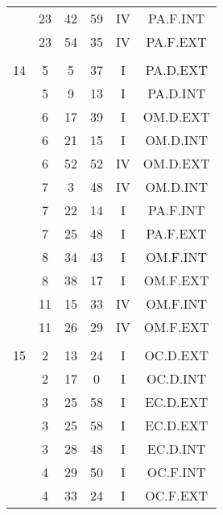 \documentclass[12pt, a4paper]{article}
\begin{document}
\begin{multicols}{3}
{\begin{tabular}{c c c c c c}
	 	 	 	 & 23 & 42 & 59 & IV & PA.F.INT\\%
	 	 	 	 & 23 & 54 & 35 & IV & PA.F.EXT\\%
	 	 	 	 & & & & & \\%
	 	 	 	14 & 5 & 5 & 37 & I & PA.D.EXT\\%
	 	 	 	 & 5 & 9 & 13 & I & PA.D.INT\\%
	 	 	 	 & 6 & 17 & 39 & I & OM.D.EXT\\%
	 	 	 	 & 6 & 21 & 15 & I & OM.D.INT\\%
	 	 	 	 & 6 & 52 & 52 & IV & OM.D.EXT\\%
	 	 	 	 & 7 & 3 & 48 & IV & OM.D.INT\\%
	 	 	 	 & 7 & 22 & 14 & I & PA.F.INT\\%
	 	 	 	 & 7 & 25 & 48 & I & PA.F.EXT\\%
	 	 	 	 & 8 & 34 & 43 & I & OM.F.INT\\%
	 	 	 	 & 8 & 38 & 17 & I & OM.F.EXT\\%
	 	 	 	 & 11 & 15 & 33 & IV & OM.F.INT\\%
	 	 	 	 & 11 & 26 & 29 & IV & OM.F.EXT\\%
	 	 	 	 & & & & & \\%
	 	 	 	15 & 2 & 13 & 24 & I & OC.D.EXT\\%
	 	 	 	 & 2 & 17 & 0 & I & OC.D.INT\\%
	 	 	 	 & 3 & 25 & 58 & I & EC.D.EXT\\%
	 	 	 	 & 3 & 25 & 58 & I & EC.D.EXT\\%
	 	 	 	 & 3 & 28 & 48 & I & EC.D.INT\\%
	 	 	 	 & 4 & 29 & 50 & I & OC.F.INT\\%
	 	 	 	 & 4 & 33 & 24 & I & OC.F.EXT\\%

\end{tabular}}
\end{multicols}
\end{document}
